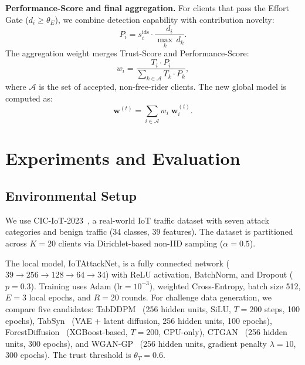 \documentclass[conference]{IEEEtran}
\begin{document}
\textbf{Performance-Score and final aggregation.} For clients that pass the Effort Gate ($d_i \ge \theta_E$), we combine detection capability with contribution novelty:
\begin{equation}
    P_i = s_i^{\text{ids}} \cdot \frac{d_i}{\max_k\, d_k}.
\label{eq:performance}
\end{equation}
The aggregation weight merges Trust-Score and Performance-Score:
\begin{equation}
    w_i = \frac{T_i \cdot P_i}{\sum_{k \in \mathcal{A}} T_k \cdot P_k},
\label{eq:weight}
\end{equation}
where $\mathcal{A}$ is the set of accepted, non-free-rider clients. The new global model is computed as:
\begin{equation}
    \mathbf{w}^{(t)} = \sum_{i \in \mathcal{A}} w_i \;\mathbf{w}_i^{(t)}.
\label{eq:aggregation}
\end{equation}

\section{Experiments and Evaluation}

\subsection{Environmental Setup}

We use CIC-IoT-2023~\cite{neto2023ciciot}, a real-world IoT traffic dataset with seven attack categories and benign traffic (34 classes, 39 features). The dataset is partitioned across $K{=}20$ clients via Dirichlet-based non-IID sampling ($\alpha{=}0.5$).

The local model, IoTAttackNet, is a fully connected network ($39{\to}256{\to}128{\to}64{\to}34$) with ReLU activation, BatchNorm, and Dropout ($p{=}0.3$). Training uses Adam (lr${=}10^{-3}$), weighted Cross-Entropy, batch size 512, $E{=}3$ local epochs, and $R{=}20$ rounds. For challenge data generation, we compare five candidates: TabDDPM~\cite{kotelnikov2023tabddpm} (256 hidden units, SiLU, $T{=}200$ steps, 100 epochs), TabSyn~\cite{zhang2024tabsyn} (VAE + latent diffusion, 256 hidden units, 100 epochs), ForestDiffusion~\cite{jolicoeurmartineau2024forest} (XGBoost-based, $T{=}200$, CPU-only), CTGAN~\cite{xu2019modeling} (256 hidden units, 300 epochs), and WGAN-GP~\cite{gulrajani2017improved} (256 hidden units, gradient penalty $\lambda{=}10$, 300 epochs). The trust threshold is $\theta_T{=}0.6$.
\end{document}
